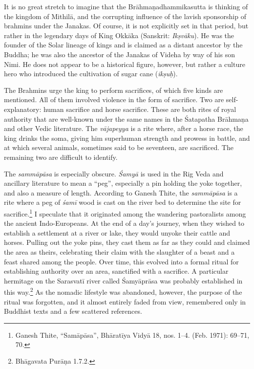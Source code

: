 \documentclass[12pt,openany]{book}%
\begin{document}
It is no great stretch to imagine that the \textsanskrit{Brāhmaṇadhammikasutta} is thinking of the kingdom of \textsanskrit{Mithilā}, and the corrupting influence of the lavish sponsorship of brahmins under the Janakas. Of course, it is not explicitly set in that period, but rather in the legendary days of King \textsanskrit{Okkāka} (Sanskrit: \textit{\textsanskrit{Ikṣvāku}}). He was the founder of the Solar lineage of kings and is claimed as a distant ancestor by the Buddha; he was also the ancestor of the Janakas of Videha by way of his son Nimi. He does not appear to be a historical figure, however, but rather a culture hero who introduced the cultivation of sugar cane (\textit{\textsanskrit{ikṣuḥ}}).

The Brahmins urge the king to perform sacrifices, of which five kinds are mentioned. All of them involved violence in the form of sacrifice. Two are self-explanatory: human sacrifice and horse sacrifice. These are both rites of royal authority that are well-known under the same names in the Śatapatha \textsanskrit{Brāhmaṇa} and other Vedic literature. The \textit{\textsanskrit{vājapeyya}} is a rite where, after a horse race, the king drinks the soma, giving him superhuman strength and prowess in battle, and at which several animals, sometimes said to be seventeen, are sacrificed. The remaining two are difficult to identify.

The \textit{\textsanskrit{sammāpāsa}} is especially obscure. \textit{\textsanskrit{Śamyā}} is used in the Rig Veda and ancillary literature to mean a “peg”, especially a pin holding the yoke together, and also a measure of length. According to Ganesh Thite, the \textit{\textsanskrit{sammāpāsa}} is a rite where a peg of \textit{\textsanskrit{śamī}} wood is cast on the river bed to determine the site for sacrifice.\footnote{Ganesh Thite, “\textsanskrit{Samāpāsa}”, \textsanskrit{Bhāratīya} \textsanskrit{Vidyā} 18, nos. 1–4. (Feb. 1971): 69–71, 70. } I speculate that it originated among the wandering pastoralists among the ancient Indo-Europeans.  At the end of a day’s journey, when they wished to establish a settlement at a river or lake, they would unyoke their cattle and horses. Pulling out the yoke pins, they cast them as far as they could and claimed the area as theirs, celebrating their claim with the slaughter of a beast and a feast shared among the people. Over time, this evolved into a formal ritual for establishing authority over an area, sanctified with a sacrifice. A particular hermitage on the \textsanskrit{Sarasvatī} river called \textsanskrit{Śamyāprāsa} was probably established in this way.\footnote{\textsanskrit{Bhāgavata} \textsanskrit{Purāṇa} 1.7.2. } As the nomadic lifestyle was abandoned, however, the purpose of the ritual was forgotten, and it almost entirely faded from view, remembered only in Buddhist texts and a few scattered references.
\end{document}
